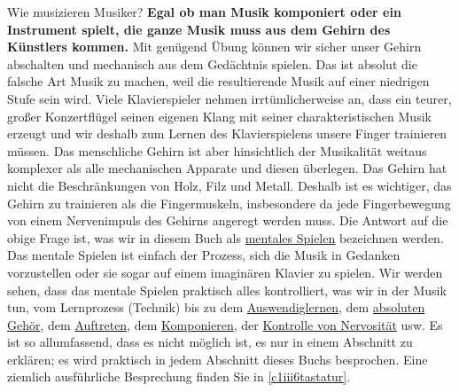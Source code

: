Wie musizieren Musiker?
\textbf{Egal ob man Musik komponiert oder ein Instrument spielt, die ganze Musik muss aus dem Gehirn des Künstlers kommen.}
Mit genügend Übung können wir sicher unser Gehirn abschalten und mechanisch aus dem Gedächtnis spielen.
Das ist absolut die falsche Art Musik zu machen, weil die resultierende Musik auf einer niedrigen Stufe sein wird.
Viele Klavierspieler nehmen irrtümlicherweise an, dass ein teurer, großer Konzertflügel seinen eigenen Klang mit seiner charakteristischen Musik erzeugt und wir deshalb zum Lernen des Klavierspielens unsere Finger trainieren müssen.
Das menschliche Gehirn ist aber hinsichtlich der Musikalität weitaus komplexer als alle mechanischen Apparate und diesen überlegen.
Das Gehirn hat nicht die Beschränkungen von Holz, Filz und Metall.
Deshalb ist es wichtiger, das Gehirn zu trainieren als die Fingermuskeln, insbesondere da jede Fingerbewegung von einem Nervenimpuls des Gehirns angeregt werden muss.
Die Antwort auf die obige Frage ist, was wir in diesem Buch als \hyperref[c1ii12mental]{mentales Spielen} bezeichnen werden.
Das mentale Spielen ist einfach der Prozess, sich die Musik in Gedanken vorzustellen oder sie sogar auf einem imaginären Klavier zu spielen.
Wir werden sehen, dass das mentale Spielen praktisch alles kontrolliert, was wir in der Musik tun, vom Lernprozess (Technik) bis zu dem \hyperref[c1iii6]{Auswendiglernen}, dem \hyperref[c1iii12]{absoluten Gehör}, dem \hyperref[c1iii14]{Auftreten}, dem \hyperref[c1iii12blatt]{Komponieren}, der \hyperref[c1iii15]{Kontrolle von Nervosität} usw.
Es ist so allumfassend, dass es nicht möglich ist, es nur in einem Abschnitt zu erklären; es wird praktisch in jedem Abschnitt dieses Buchs besprochen.
Eine ziemlich ausführliche Besprechung finden Sie in \hyperref[c1iii6tastatur]{\ref*{c1iii6tastatur}}.

